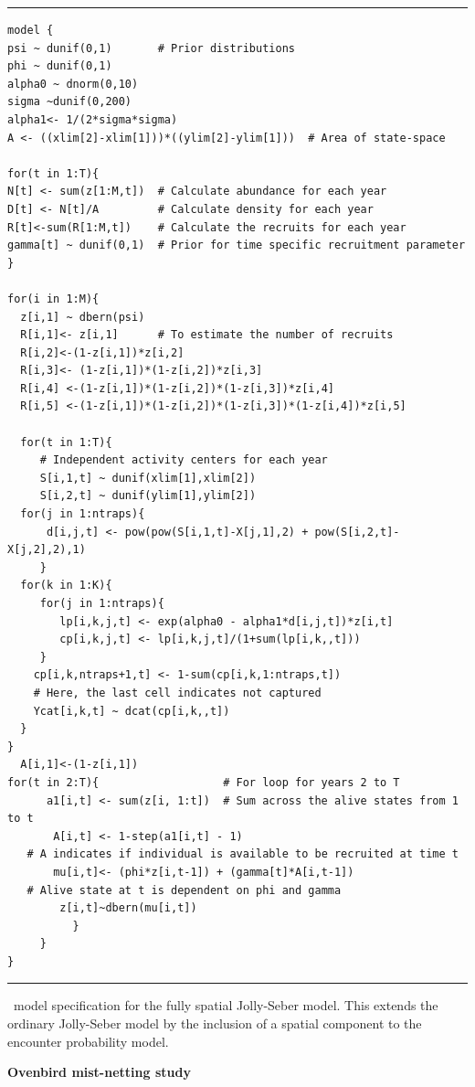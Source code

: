\begin{panel}[htp]
\centering
\rule[0.1in]{\textwidth}{.03in}
{\small
\begin{verbatim}
model {
psi ~ dunif(0,1)       # Prior distributions
phi ~ dunif(0,1)
alpha0 ~ dnorm(0,10)
sigma ~dunif(0,200)
alpha1<- 1/(2*sigma*sigma)
A <- ((xlim[2]-xlim[1]))*((ylim[2]-ylim[1]))  # Area of state-space

for(t in 1:T){
N[t] <- sum(z[1:M,t])  # Calculate abundance for each year
D[t] <- N[t]/A	       # Calculate density for each year
R[t]<-sum(R[1:M,t])    # Calculate the recruits for each year
gamma[t] ~ dunif(0,1)  # Prior for time specific recruitment parameter
}

for(i in 1:M){
  z[i,1] ~ dbern(psi)
  R[i,1]<- z[i,1]      # To estimate the number of recruits
  R[i,2]<-(1-z[i,1])*z[i,2]
  R[i,3]<- (1-z[i,1])*(1-z[i,2])*z[i,3]
  R[i,4] <-(1-z[i,1])*(1-z[i,2])*(1-z[i,3])*z[i,4]
  R[i,5] <-(1-z[i,1])*(1-z[i,2])*(1-z[i,3])*(1-z[i,4])*z[i,5]

  for(t in 1:T){
     # Independent activity centers for each year
     S[i,1,t] ~ dunif(xlim[1],xlim[2]) 
     S[i,2,t] ~ dunif(ylim[1],ylim[2])
  for(j in 1:ntraps){
      d[i,j,t] <- pow(pow(S[i,1,t]-X[j,1],2) + pow(S[i,2,t]-X[j,2],2),1)
     }
  for(k in 1:K){
     for(j in 1:ntraps){
        lp[i,k,j,t] <- exp(alpha0 - alpha1*d[i,j,t])*z[i,t]
        cp[i,k,j,t] <- lp[i,k,j,t]/(1+sum(lp[i,k,,t]))
     }
    cp[i,k,ntraps+1,t] <- 1-sum(cp[i,k,1:ntraps,t]) 
    # Here, the last cell indicates not captured
    Ycat[i,k,t] ~ dcat(cp[i,k,,t])
  }
}
  A[i,1]<-(1-z[i,1])
for(t in 2:T){                   # For loop for years 2 to T
      a1[i,t] <- sum(z[i, 1:t])  # Sum across the alive states from 1 to t
       A[i,t] <- 1-step(a1[i,t] - 1)   
   # A indicates if individual is available to be recruited at time t
       mu[i,t]<- (phi*z[i,t-1]) + (gamma[t]*A[i,t-1])
   # Alive state at t is dependent on phi and gamma
        z[i,t]~dbern(mu[i,t])
          }
     }
}
\end{verbatim}
}
\rule[-0.1in]{\textwidth}{.03in}
\caption{
\jags~model specification for the fully spatial Jolly-Seber
model. This extends the ordinary Jolly-Seber model by the inclusion of
a spatial component to the encounter probability model. }
\label{open.panel.spatialJS}
\end{panel}


{\flushleft \bf Ovenbird mist-netting study}

